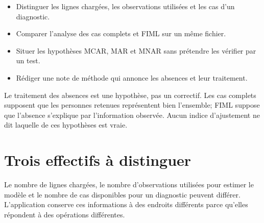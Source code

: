 \documentclass[
  french,
  11pt,
  a4paper,
  DIV=11,
  numbers=noendperiod]{scrreprt}
\providecommand{\tightlist}{%
  \setlength{\itemsep}{0pt}\setlength{\parskip}{0pt}}
\begin{document}
\begin{tcolorbox}[enhanced jigsaw, arc=.35mm, bottomrule=.15mm, bottomtitle=1mm, breakable, colback=white, colbacktitle=quarto-callout-note-color!10!white, colframe=quarto-callout-note-color-frame, coltitle=black, left=2mm, leftrule=.75mm, opacityback=0, opacitybacktitle=0.6, rightrule=.15mm, title={Objectifs du chapitre}, titlerule=0mm, toprule=.15mm, toptitle=1mm]

\begin{itemize}
\tightlist
\item
  Distinguer les lignes chargées, les observations utilisées et les cas
  d'un diagnostic.
\item
  Comparer l'analyse des cas complets et FIML sur un même fichier.
\item
  Situer les hypothèses MCAR, MAR et MNAR sans prétendre les vérifier
  par un test.
\item
  Rédiger une note de méthode qui annonce les absences et leur
  traitement.
\end{itemize}

\end{tcolorbox}

\begin{tcolorbox}[enhanced jigsaw, arc=.35mm, bottomrule=.15mm, bottomtitle=1mm, breakable, colback=white, colbacktitle=quarto-callout-tip-color!10!white, colframe=quarto-callout-tip-color-frame, coltitle=black, left=2mm, leftrule=.75mm, opacityback=0, opacitybacktitle=0.6, rightrule=.15mm, title={Idée centrale}, titlerule=0mm, toprule=.15mm, toptitle=1mm]

Le traitement des absences est une hypothèse, pas un correctif. Les cas
complets supposent que les personnes retenues représentent bien
l'ensemble; FIML suppose que l'absence s'explique par l'information
observée. Aucun indice d'ajustement ne dit laquelle de ces hypothèses
est vraie.

\end{tcolorbox}

\section{Trois effectifs à
distinguer}\label{trois-effectifs-uxe0-distinguer}

Le nombre de lignes chargées, le nombre d'observations utilisées pour
estimer le modèle et le nombre de cas disponibles pour un diagnostic
peuvent différer. L'application conserve ces informations à des endroits
différents parce qu'elles répondent à des opérations différentes.
\end{document}
